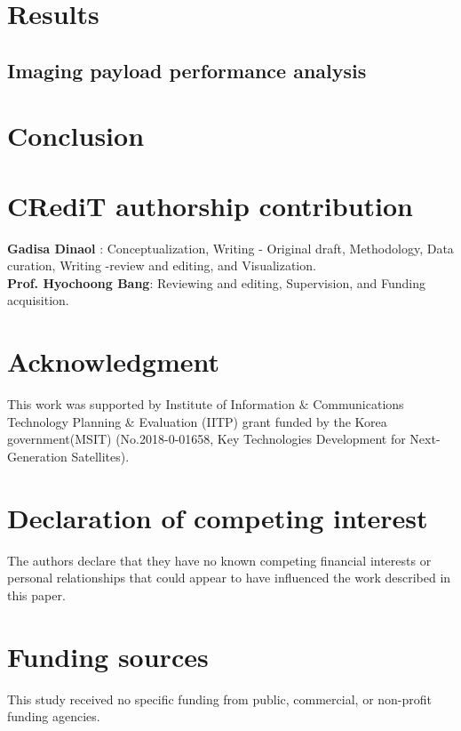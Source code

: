 \documentclass[final,5p,times,sort&compress,twocolumn]{elsarticle}
\begin{document}
\section{Results}
\subsection{Imaging payload performance analysis}
\section{Conclusion}
\section*{CRediT authorship contribution }
\textbf{Gadisa Dinaol }: Conceptualization,  Writing - Original draft, Methodology, Data curation, Writing -review and editing, and Visualization.\\
\textbf{Prof. Hyochoong Bang}: Reviewing and editing,  Supervision, and Funding acquisition.
\section*{Acknowledgment}
This work was supported by Institute of Information $\&$ Communications Technology Planning $\&$ Evaluation (IITP) grant funded by the Korea government(MSIT) (No.2018-0-01658, Key Technologies Development for Next-Generation Satellites).
\section*{Declaration of competing interest}
The authors declare that they have no known competing financial interests or personal relationships that could appear to have influenced the work described in this paper.
\section*{Funding sources}
This study received no specific funding from public, commercial, or non-profit funding agencies.
 





\end{document}
